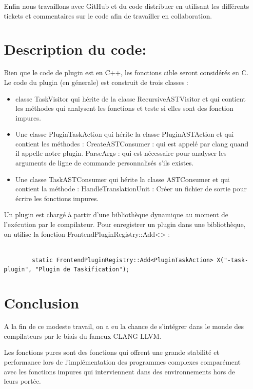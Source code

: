 \documentclass[12pt,titlepage]{article}
\begin{document}
Enfin nous travaillons avec GitHub et du code distribuer en utilisant les différents tickets et commentaires sur le code afin de travailler en collaboration.


\section {Description du code:}
Bien que le code de plugin est en C++, les fonctions cible seront considérés en C. 
Le code du plugin (en génerale) est construit de trois classes :
\begin{itemize}


 	\item classe TaskVisitor qui hérite de la classe RecursiveASTVisitor et qui contient les méthodes qui analysent les fonctions et teste si elles sont des fonction impures.

	\item Une classe PluginTaskAction qui hérite la classe PluginASTAction et qui contient les méthodes :
		CreateASTConsumer : qui est appelé par clang quand il appelle notre plugin.
		ParseArgs : qui est nécessaire pour analyser les arguments de ligne de commande personnalisés s'ils existes.

     \item Une classe TaskASTConsumer qui hérite la classe ASTConsumer et qui contient la méthode :
     	HandleTranslationUnit : Créer un fichier de sortie pour écrire les fonctions impures.
\end{itemize}
     
    Un plugin est chargé à partir d'une bibliothèque dynamique au moment de l'exécution par le compilateur. Pour enregistrer un plugin dans une bibliothèque, on utilise la fonction FrontendPluginRegistry::Add<> :
\begin{lstlisting}

 		static FrontendPluginRegistry::Add<PluginTaskAction> X("-task-plugin", "Plugin de Taskification");

\end{lstlisting}

\pagebreak
\section*{Conclusion}

A la fin de ce modeste travail, on a eu la chance de s'intégrer dans le monde des compilateurs par le biais du fameux CLANG LLVM.

Les fonctions pures sont des fonctions qui offrent une grande stabilité et performance lors de l'implémentation des programmes complexes comparément avec les fonctions impures qui interviennent dans des environnements hors de leurs portée.
\end{document}

